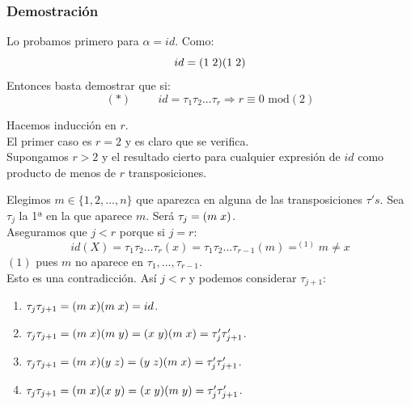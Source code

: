 \documentclass[11pt,a4paper]{article}
\begin{document}
\subsubsection*{Demostración}

Lo probamos primero para $\alpha = id$. Como:
$$id = (1 \hspace{0.1cm} 2) (1 \hspace{0.1cm} 2)$$
Entonces basta demostrar  que si:
$$(*) \hspace{1cm} id = \tau_{1} \tau_{2} ... \tau_{r} \Rightarrow r \equiv 0 \text{ mod}(2)$$

Hacemos inducción en $r$. \\
El primer caso es $r = 2$ y es claro que se verifica. \\
Supongamos $r > 2$ y el resultado cierto para cualquier expresión de $id$ como producto de menos de $r$ transposiciones.

Elegimos $m \in \{1, 2, ..., n\}$ que aparezca en alguna de las transposiciones $\tau's$. Sea $\tau_{j}$ la 1ª en la que aparece $m$. Será $\tau_{j} = (m \hspace{0.1cm} x)$. \\
Aseguramos que $j < r$ porque si $j = r$:
$$id(X) = \tau_{1} \tau_{2} ... \tau_{r} (x) = \tau_{1} \tau_{2} ... \tau_{r-1} (m) =^{(1)} m \neq x$$
$(1)$ pues $m$ no aparece en $\tau_{1}, ..., \tau_{r-1}$. \\
Esto es una contradicción. Así $j < r$ y podemos considerar $\tau_{j+1}$:
\begin{enumerate}
\item $\tau_{j} \tau_{j+1} = (m \hspace{0.1cm} x) (m \hspace{0.1cm} x) = id$.
\item $\tau_{j} \tau_{j+1} = (m \hspace{0.1cm} x) (m \hspace{0.1cm} y) = (x \hspace{0.1cm} y) (m \hspace{0.1cm} x) = \tau'_{j} \tau'_{j+1}$.
\item $\tau_{j} \tau_{j+1} = (m \hspace{0.1cm} x) (y \hspace{0.1cm} z) = (y \hspace{0.1cm} z) (m \hspace{0.1cm} x) = \tau'_{j} \tau'_{j+1}$.
\item $\tau_{j} \tau_{j+1} = (m \hspace{0.1cm} x) (x \hspace{0.1cm} y) = (x \hspace{0.1cm} y) (m \hspace{0.1cm} y) = \tau'_{j} \tau'_{j+1}$.
\end{enumerate}
\end{document}
